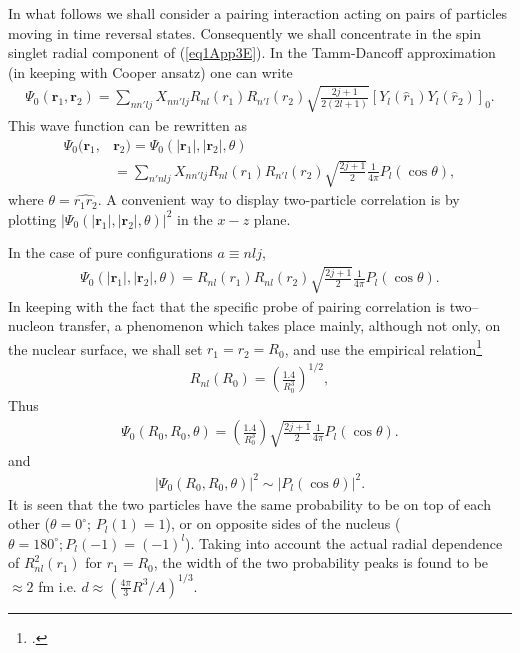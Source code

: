 In what follows we shall consider a pairing interaction acting on pairs of particles moving in time reversal states. Consequently we shall concentrate in the spin singlet radial component of (\ref{eq1App3E}). In the Tamm-Dancoff approximation (in keeping with Cooper ansatz) one can write
\begin{align}\label{eq2App3E}
\Psi_0(\mathbf r_1,\mathbf r_2)=\sum_{nn'lj}X_{nn'lj}R_{nl}(r_1)R_{n'l}(r_2)\sqrt{\frac{2j+1}{2(2l+1)}}\left[Y_l(\hat r_1)Y_l(\hat r_2)\right]_0.
\end{align}
This wave function can be rewritten as
\begin{align}\label{eq3App3Ex}
\nonumber\Psi_0(\mathbf r_1,&\mathbf r_2)=\Psi_0(|\mathbf r_1|,|\mathbf r_2|,\theta)\\
&=\sum_{n'nlj}X_{nn'lj}R_{nl}(r_1)R_{n'l}(r_2)\sqrt{\frac{2j+1}{2}}\frac{1}{4\pi}P_l(\cos\theta),
\end{align}
where $\theta=\widehat{r_1r_2}$. A convenient way to display two-particle correlation is by plotting $|\Psi_0(|\mathbf r_1|,|\mathbf r_2|,\theta)|^2$ in the $x-z$ plane.


In the case of pure configurations $a\equiv nlj$,
\begin{align}\label{eq4App3Ex}
\Psi_0(|\mathbf r_1|,|\mathbf r_2|,\theta)
=R_{nl}(r_1)R_{nl}(r_2)\sqrt{\frac{2j+1}{2}}\frac{1}{4\pi}P_l(\cos\theta).
\end{align}
In keeping with the fact that the specific probe of pairing correlation is two--nucleon transfer, a phenomenon which takes place mainly, although not only, on the nuclear surface, we shall set $r_1=r_2=R_0$, and use the empirical relation\footnote{\cite{Bohr:69}.}
\begin{align}\label{eq5App3Ex}
R_{nl}(R_0)=\left(\frac{1.4}{R_0^3}\right)^{1/2},
\end{align}
Thus 
\begin{align}\label{eq6App3E}
\Psi_0(R_0,R_0,\theta)
=\left(\frac{1.4}{R_0^3}\right)\sqrt{\frac{2j+1}{2}}\frac{1}{4\pi}P_l(\cos\theta).
\end{align}
and 
\begin{align}\label{eq7App3E}
|\Psi_0(R_0,R_0,\theta)|^2\sim |P_l(\cos\theta)|^2.
\end{align}
It is seen that the two particles have the same probability to be on top of each other ($\theta=0^\circ$; $P_l(1)=1$), or on opposite sides of the nucleus ($\theta=180^\circ; P_l(-1)=(-1)^l$). Taking into account the actual radial dependence of $R^2_{nl}(r_1)$ for $r_1=R_0$, the width of the two probability peaks is found to be $\approx 2$ fm i.e. $d\approx\left(\frac{4\pi}{3}R^3/A\right)^{1/3}$.

